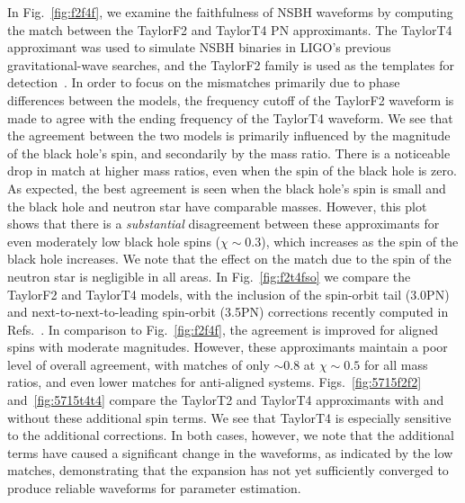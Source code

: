 In Fig.~\ref{fig:f2f4f}, we examine the faithfulness of \ac{NSBH} waveforms by computing the match between the TaylorF2 and TaylorT4 \ac{PN} approximants.
The TaylorT4 approximant was used to simulate \ac{NSBH} binaries in LIGO's
previous gravitational-wave searches, and the TaylorF2 family is used as the
templates for detection~\cite{Abadie:2011nz}.
In order to focus
on the mismatches primarily due to phase differences between the models, the
frequency cutoff of the TaylorF2 waveform is made to agree with the ending
frequency of the TaylorT4 waveform. We see that the agreement between the two
models is primarily influenced by the magnitude of the black hole's spin, and
secondarily by the mass ratio. There is a noticeable drop in match at higher
mass ratios, even when
the spin of the black hole is zero. As expected, the best
agreement is seen when the black hole's spin is small and
the black hole and neutron star have comparable masses.
However, this plot shows that there is a \emph{substantial} disagreement between
these approximants for even moderately low black hole spins ($\chi \sim 0.3$),
which increases as the spin of the black hole increases. 
We note that the effect on the match due to the spin of the
neutron star is negligible in all areas.  In Fig.~\ref{fig:f2t4fso} we compare
the TaylorF2 and TaylorT4 models, with the inclusion of the spin-orbit
tail (3.0\ac{PN}) and next-to-next-to-leading spin-orbit (3.5\ac{PN})
corrections recently computed in Refs.~\cite{Bohe:2012mr, Blanchet:2012sm}.  In comparison to
Fig.~\ref{fig:f2f4f}, the agreement is improved for aligned spins
with moderate magnitudes. However, these approximants maintain a poor level of
overall agreement, with matches of only $\sim 0.8$ at $\chi \sim 0.5$ for all mass ratios, and even
lower matches for anti-aligned systems. 
Figs.~\ref{fig:5715f2f2} and~\ref{fig:5715t4t4} compare the TaylorT2 and TaylorT4 approximants with and without
these additional spin terms.
We see that TaylorT4 is especially sensitive to the additional corrections.
In both cases, however, we note that the additional terms have caused a significant change in the waveforms, 
as indicated by the low matches, demonstrating that the expansion has
not yet sufficiently converged to produce reliable waveforms for parameter estimation. 

